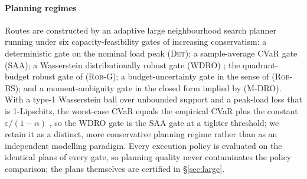 \documentclass[preprint,authoryear,12pt]{elsarticle}
\theoremstyle{definition}
\theoremstyle{remark}
\begin{document}
\paragraph{Planning regimes} Routes are constructed by an adaptive
large neighbourhood search planner running under six capacity-feasibility
gates of increasing conservatism: a deterministic gate on the nominal
load peak (\textsc{Det}); a sample-average CVaR gate (\textsc{SAA}); a
Wasserstein distributionally robust gate (\textsc{WDRO})
\citep{esfahani2018data}; the quadrant-budget robust gate of
\citet{gounaris2013robust} (\textsc{Rob-G}); a budget-uncertainty gate
in the sense of \citet{bertsimas2004price} (\textsc{Rob-BS}); and a
moment-ambiguity gate in the closed form implied by
\citet{ghosal2024unifying} (\textsc{M-DRO}). With a type-1 Wasserstein
ball over unbounded support and a peak-load loss that is 1-Lipschitz,
the worst-case CVaR equals the empirical CVaR plus the constant
$\varepsilon/(1-\alpha)$ \citep{esfahani2018data}, so the
\textsc{WDRO} gate is the \textsc{SAA} gate at a tighter threshold; we
retain it as a distinct, more conservative planning regime rather than
as an independent modelling paradigm. Every execution policy is
evaluated on the identical plans of every gate, so planning quality
never contaminates the policy comparison; the plans themselves are
certified in \S\ref{sec:large}.
\end{document}
